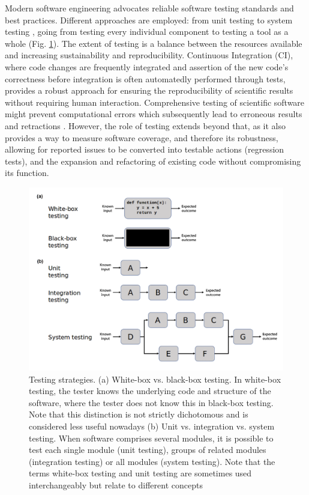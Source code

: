 Modern software engineering advocates reliable software testing standards and best practices. Different approaches are employed: from unit testing to system testing \cite{krafczyk_scientific_2019}, going from testing every individual component to testing a tool as a whole (Fig. \ref{fig:chap8_figure1}). The extent of testing is a balance between the resources available and increasing sustainability and reproducibility. Continuous Integration (CI), where code changes are frequently integrated and assertion of the new code’s correctness before integration is often automatedly performed through tests, provides a robust approach for ensuring the reproducibility of scientific results without requiring human interaction. Comprehensive testing of scientific software might prevent computational errors which subsequently lead to erroneous results and retractions \cite{chang_retraction_2006,hall_retraction_2007}. However, the role of testing extends beyond that, as it also provides a way to measure software coverage, and therefore its robustness, allowing for reported issues to be converted into testable actions (regression tests), and the expansion and refactoring of existing code without compromising its function.

\begin{figure}[]
\centering
\includegraphics[width=\textwidth]{figures/chapter 8/mgen000790-f1.png}
\caption{Testing strategies. (a) White-box vs. black-box testing. In white-box testing, the tester knows the underlying code and structure of the software, where the tester does not know this in black-box testing. Note that this distinction is not strictly dichotomous and is considered less useful nowadays (b) Unit vs. integration vs. system testing. When software comprises several modules, it is possible to test each single module (unit testing), groups of related modules (integration testing) or all modules (system testing). Note that the terms white-box testing and unit testing are sometimes used interchangeably but relate to different concepts}
\label{fig:chap8_figure1}
\end{figure}

